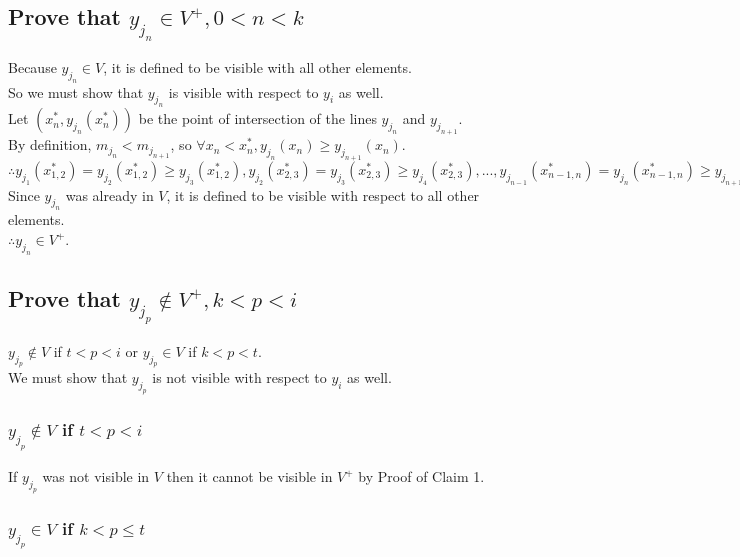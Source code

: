 \documentclass{article}
\begin{document}
\subsection{Prove that $y_{j_n} \in V^+, 0 < n < k$}
Because $y_{j_n} \in V$, it is defined to be visible with all other elements.\\
So we must show that $y_{j_n}$ is visible with respect to $y_i$ as well.\\
Let $(x^*_n, y_{j_n}(x^*_n))$ be the point of intersection of the lines $y_{j_n}$ and $y_{j_{n+1}}$.\\
By definition, $m_{j_n} < m_{j_{n+1}}$, so $\forall x_n < x^*_n, y_{j_n} (x_n) \geq y_{j_{n+1}} (x_n)$.\\
$\therefore y_{j_{1}}(x^*_{1,2}) = y_{j_{2}}(x^*_{1,2}) \geq y_{j_3}(x^*_{1,2}), y_{j_{2}}(x^*_{2,3}) = y_{j_{3}}(x^*_{2,3}) \geq y_{j_4}(x^*_{2,3}), ..., y_{j_{n-1}}(x^*_{n-1,n}) = y_{j_{n}}(x^*_{n-1,n}) \geq y_{j_{n+1}}(x^*_{n-1,n}), ..., y_{j_{k-1}}(x^*_{k-1,k}) = y_{j_{k}}(x^*_{k-1,k}) \geq y_{j_{i}}(x^*_{k-1,k})$\\
Since $y_{j_n}$ was already in $V$, it is defined to be visible with respect to all other elements.\\
$\therefore y_{j_n} \in V^+$.

\subsection{Prove that $y_{j_p} \notin V^+, k < p < i$}
$y_{j_p} \notin V$ if $t < p < i$ or $y_{j_p} \in V$ if $k < p < t$.\\
We must show that $y_{j_p}$ is not visible with respect to $y_i$ as well.

\subsubsection{$y_{j_p} \notin V$ if $t < p < i$}
If $y_{j_p}$ was not visible in $V$ then it cannot be visible in $V^+$ by Proof of Claim 1.

\subsubsection{$y_{j_p} \in V$ if $k < p \leq t$}
\end{document}
